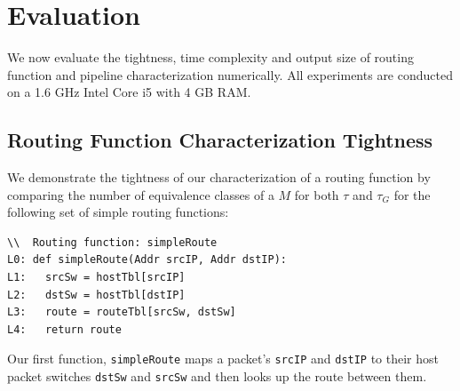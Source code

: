 \section{Evaluation}\label{sec:evaluation}

We now evaluate the tightness, time complexity and output size of routing function and pipeline characterization numerically. All experiments are conducted on a 1.6 GHz Intel Core i5 with 4 GB RAM.


\subsection{Routing Function Characterization Tightness}
\label{sec:eval1}

We demonstrate the tightness of our characterization of a routing function by comparing the number of equivalence classes of a $M$ for both $\tau$ and $\tau_G$ for the following set of simple routing functions:


{\small
\begin{verbatim}
\\  Routing function: simpleRoute
L0: def simpleRoute(Addr srcIP, Addr dstIP):
L1:   srcSw = hostTbl[srcIP]
L2:   dstSw = hostTbl[dstIP]
L3:   route = routeTbl[srcSw, dstSw]
L4:   return route
\end{verbatim}
}

Our first function, \texttt{simpleRoute} maps a packet's \texttt{srcIP} and \texttt{dstIP} to their host packet switches \texttt{dstSw} and \texttt{srcSw} and then looks up the route between them.


